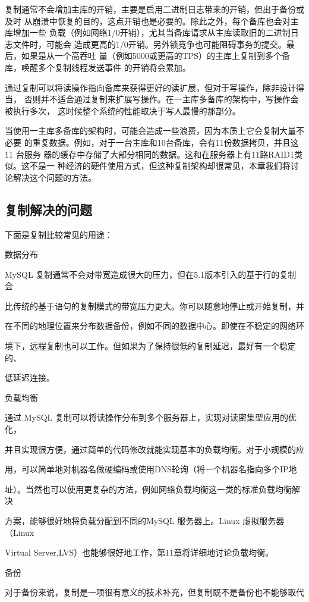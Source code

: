 复制通常不会增加主库的开销，主要是启用二进制日志带来的开销，但出于备份或及时
从崩溃中恢复的目的，这点开销也是必要的。除此之外，每个备库也会对主库增加一些
负载（例如网络1/0开销），尤其当备库请求从主库读取旧的二进制日志文件时，可能会
造成更高的1/0开销。另外锁竞争也可能阻碍事务的提交。最后，如果是从一个高吞吐
量（例如5000或更高的TPS）的主库上复制到多个备库，唤醒多个复制线程发送事件
的开销将会累加。

通过复制可以将读操作指向备库来获得更好的读扩展，但对于写操作，除非设计得当，
否则并不适合通过复制来扩展写操作。在一主库多备库的架构中，写操作会被执行多次，
这时候整个系统的性能取决于写人最慢的那部分。

当使用一主库多备库的架构时，可能会造成一些浪费，因为本质上它会复制大量不必要
的重复数据。例如，对于一台主库和10台备库，会有11份数据拷贝，并且这11 台服务
器的缓存中存储了大部分相同的数据。这和在服务器上有11路RAID1类似。这不是一
种经济的硬件使用方式，但这种复制架构却很常见，本章我们将讨论解决这个问题的方法。
\subsection{复制解决的问题}
下面是复制比较常见的用途：

数据分布

MySQL 复制通常不会对带宽造成很大的压力，但在5.1版本引入的基于行的复制会

比传统的基于语句的复制模式的带宽压力更大。你可以随意地停止或开始复制，并

在不同的地理位置来分布数据备份，例如不同的数据中心。即使在不稳定的网络环

境下，远程复制也可以工作。但如果为了保持很低的复制延迟，最好有一个稳定的、

低延迟连接。

负载均衡

通过 MySQL 复制可以将读操作分布到多个服务器上，实现对读密集型应用的优化，

并且实现很方便，通过简单的代码修改就能实现基本的负载均衡。对于小规模的应

用，可以简单地对机器名做硬编码或使用DNS轮询（将一个机器名指向多个IP地

址）。当然也可以使用更复杂的方法，例如网络负载均衡这一类的标准负载均衡解决

方案，能够很好地将负载分配到不同的MySQL 服务器上。Linux 虚拟服务器（Linux

Virtual Server,LVS）也能够很好地工作，第11章将详细地讨论负载均衡。

备份

对于备份来说，复制是一项很有意义的技术补充，但复制既不是备份也不能够取代

